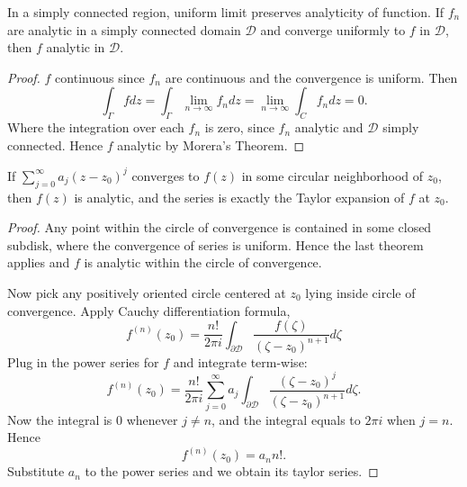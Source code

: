 \begin{theorem}
	In a simply connected region, uniform limit preserves analyticity of function. If $f_n$ are analytic in a simply connected domain $\mathcal{D}$ and converge uniformly to $f$ in $\mathcal{D}$, then $f$ analytic in $\mathcal{D}$.
\end{theorem}
\begin{proof}
	$f$ continuous since $f_n$ are continuous and the convergence is uniform. Then 
	\[
		\int_\Gamma f dz = \int _\Gamma \lim_{n \to \infty} f_n dz = \lim_{n \to \infty} \int _C f_n dz = 0
	.\] 
	Where the integration over each $f_n$ is zero, since $f_n$ analytic and $\mathcal{D}$ simply connected.
	Hence $f$ analytic by Morera's Theorem.
\end{proof}

\begin{theorem}
	If $\sum_{j=0}^{\infty} a_j (z-z_0)^j$ converges to $f(z)$ in some circular neighborhood of $z_0$, then $f(z)$ is analytic, and the series is exactly the Taylor expansion of $f$ at $z_0$.
\end{theorem}
\begin{proof}
	Any point within the circle of convergence is contained in some closed subdisk, where the convergence of series is uniform. Hence the last theorem applies and $f$ is analytic within the circle of convergence.

	Now pick any positively oriented circle centered at $z_0$ lying inside circle of convergence. Apply Cauchy differentiation formula,
	\[
		f^{(n)}(z_0)=\frac{n !}{2 \pi i} \int_{\partial \mathcal{D}} \frac{f(\zeta)}{(\zeta-z_0)^{n+1}} d \zeta
	\]
	Plug in the power series for $f$ and integrate term-wise:
	\[
		f^{(n)}(z_0)=\frac{n !}{2 \pi i} \sum_{j=0}^{\infty } a_j \int_{\partial \mathcal{D}} \frac{(\zeta-z_0)^j}{(\zeta-z_0)^{n+1}} d \zeta
	.\] 
	Now the integral is $0$ whenever $j\neq n$, and the integral equals to $2 \pi i$ when $j = n$. Hence
	\[
		f^{(n)}(z_0) = a_n n!
	.\] 
	Substitute $a_n$ to the power series and we obtain its taylor series.
\end{proof}

